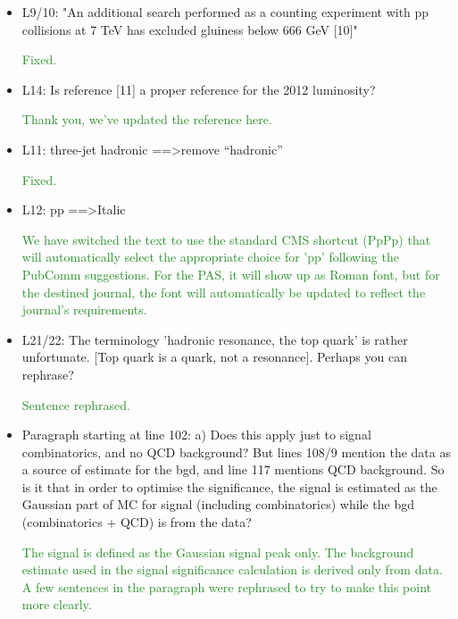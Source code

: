 \documentclass[paper=a4, fontsize=11pt]{scrartcl}
\begin{document}
\begin{itemize}
\item L9/10: 
"An additional search performed as a counting experiment with pp collisions 
at 7 TeV has excluded gluiness below 666 GeV [10]" 

\textcolor{ForestGreen}{Fixed.}\\

\item L14: 
Is reference [11] a proper reference for the 2012 luminosity? 

\textcolor{ForestGreen}{Thank you, we've updated the reference here.}\\

\item L11: 
three-jet hadronic ==\textgreater remove “hadronic” 

\textcolor{ForestGreen}{Fixed.}\\

\item L12: 
pp ==\textgreater Italic 

\textcolor{ForestGreen}{We have switched the text to use the standard CMS shortcut (PpPp)
that will automatically select the appropriate choice for 'pp' following the PubComm
suggestions. For the PAS, it will show up as Roman font, but for the destined journal,
the font will automatically be updated to reflect the journal's requirements.}\\

\item L21/22: 
The terminology 'hadronic resonance, the top quark' is rather unfortunate. 
[Top quark is a quark, not a resonance]. Perhaps you can rephrase? 

\textcolor{ForestGreen}{Sentence rephrased.}\\

\item Paragraph starting at line 102: 
a) Does this apply just to signal combinatorics, and no QCD background? But 
lines 108/9 mention the data as a source of estimate for the bgd, and line 
117 mentions QCD background. So is it that in order to optimise the 
significance, the signal is estimated as the Gaussian part of MC for signal 
(including combinatorics) while the bgd (combinatorics + QCD) is from the 
data?

\textcolor{ForestGreen}{The signal is defined as the Gaussian signal peak only.
The background estimate used in the signal significance calculation is
derived only from data. A few sentences in the paragraph were rephrased
to try to make this point more clearly.}\\


\end{itemize}
\end{document}
